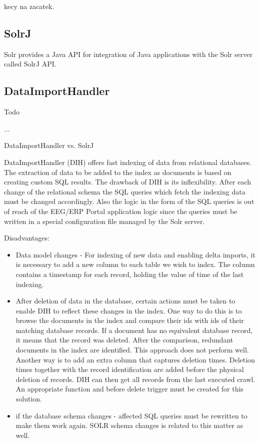 \documentclass[12pt, oneside, a4paper]{book}
\begin{document}
kecy na zacatek.

\subsection{SolrJ}

Solr provides a Java API for integration of Java applications with the Solr server called SolrJ API.

\subsection{DataImportHandler}

Todo

...

DataImportHandler vs. SolrJ

DataImportHandler (DIH) offers fast indexing of data from relational databases. 
The extraction of data to be added to the index as documents is based on creating custom SQL results. 
The drawback of DIH is its inflexibility. 
After each change of the relational schema the SQL queries which fetch the indexing data must be changed accordingly. 
Also the logic in the form of the SQL queries is out of reach of the EEG/ERP Portal application logic since the queries must be written in a special configuration file managed by the Solr server.

Disadvantages:
\begin{itemize}


\item Data model changes - For indexing of new data and enabling delta imports, it is necessary to add a new column to each table we wish to index. The column contains a timestamp for each record, holding the value of time of the last indexing.

\item After deletion of data in the database, certain actions must be taken to enable DIH to reflect these changes in the index. 
One way to do this is to browse the documents in the index and compare their ids with ids of their matching database records. If a document has no equivalent database record, it means that the record was deleted. After the comparison, redundant documents in the index are identified. This approach does not perform well.
Another way is to add an extra column that captures deletion times. Deletion times together with the record identification are added before the physical deletion of records. DIH can then get all records from the last executed crawl. An appropriate function and before delete trigger must be created for this solution. 

\item if the database schema changes - affected SQL queries must be rewritten to make them work again. SOLR schema changes is related to this matter as well. 

\end{itemize}
\end{document}
